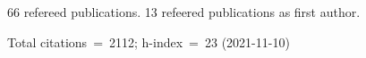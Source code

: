 66 refereed publications. 13 refeered publications as first author.

Total citations~=~2112; h-index~=~23 (2021-11-10)